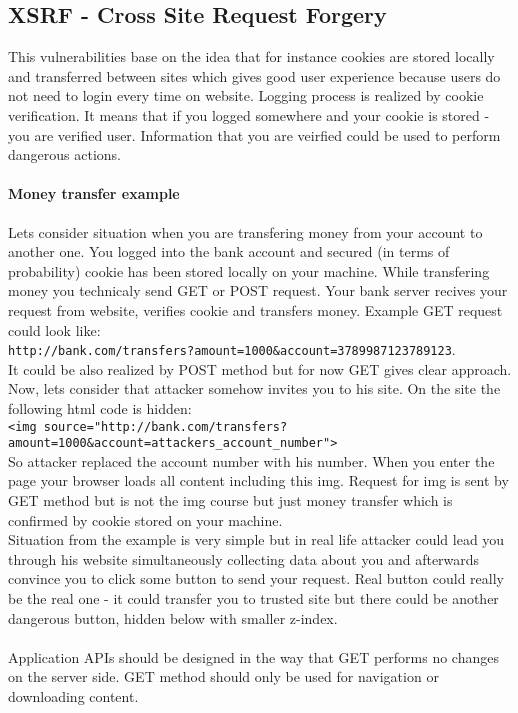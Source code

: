 \subsection{XSRF - Cross Site Request Forgery}
This vulnerabilities base on the idea that for instance cookies are stored locally and transferred between sites which gives good user experience because users do not need to login every time on website.
Logging process is realized by cookie verification.
It means that if you logged somewhere and your cookie is stored - you are verified user.
Information that you are veirfied could be used to perform dangerous actions.

\paragraph{Money transfer example} Lets consider situation when you are transfering money from your account to another one.
You logged into the bank account and secured (in terms of probability) cookie has been stored locally on your machine.
While transfering money you technicaly send GET or POST request.
Your bank server recives your request from website, verifies cookie and transfers money.
Example GET request could look like: \\
\texttt{http://bank.com/transfers?amount=1000\&account=3789987123789123}. \\
It could be also realized by POST method but for now GET gives clear approach.
Now, lets consider that attacker somehow invites you to his site.
On the site the following html code is hidden: \\
\texttt{<img source="http://bank.com/transfers?amount=1000\&account=attackers\_account\_number">}\\
So attacker replaced the account number with his number.
When you enter the page your browser loads all content including this img.
Request for img is sent by GET method but is not the img course but just money transfer which is confirmed by cookie stored on your machine.\\

Situation from the example is very simple but in real life attacker could lead you through his website simultaneously collecting data about you and afterwards convince you to click some button to send your request.
Real button could really be the real one - it could transfer you to trusted site but there could be another dangerous button, hidden below with smaller z-index. \\\\
Application APIs should be designed in the way that GET performs no changes on the server side.
GET method should only be used for navigation or downloading content.
